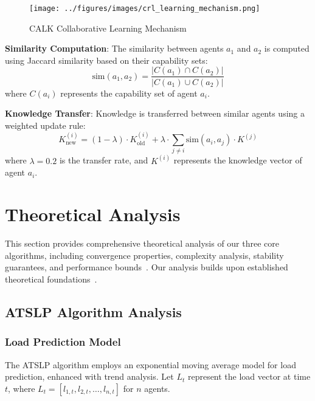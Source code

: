 \documentclass[conference]{IEEEtran}
\begin{document}
\begin{figure}[htbp]
\centering
\texttt{[image: ../figures/images/crl\_learning\_mechanism.png]}
\caption{CALK Collaborative Learning Mechanism}
\label{fig:calk}
\end{figure}

\textbf{Similarity Computation}: The similarity between agents $a_1$ and $a_2$ is computed using Jaccard similarity based on their capability sets:
\begin{equation}
\text{sim}(a_1, a_2) = \frac{|C(a_1) \cap C(a_2)|}{|C(a_1) \cup C(a_2)|}
\end{equation}
where $C(a_i)$ represents the capability set of agent $a_i$.

\textbf{Knowledge Transfer}: Knowledge is transferred between similar agents using a weighted update rule:
\begin{equation}
K_{\text{new}}^{(i)} = (1-\lambda) \cdot K_{\text{old}}^{(i)} + \lambda \cdot \sum_{j \neq i} \text{sim}(a_i, a_j) \cdot K^{(j)}
\end{equation}
where $\lambda = 0.2$ is the transfer rate, and $K^{(i)}$ represents the knowledge vector of agent $a_i$.

\section{Theoretical Analysis}

This section provides comprehensive theoretical analysis of our three core algorithms, including convergence properties, complexity analysis, stability guarantees, and performance bounds~\cite{sutton2018reinforcement,vaswani2017attention,cormen2009introduction}. Our analysis builds upon established theoretical foundations~\cite{skiena2008algorithm,sedgewick2011algorithms}.

\subsection{ATSLP Algorithm Analysis}

\subsubsection{Load Prediction Model}

The ATSLP algorithm employs an exponential moving average model for load prediction, enhanced with trend analysis. Let $L_t$ represent the load vector at time $t$, where $L_t = [l_{1,t}, l_{2,t}, \ldots, l_{n,t}]$ for $n$ agents.
\end{document}
